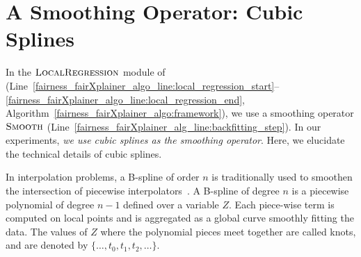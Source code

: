 \section{A Smoothing Operator: Cubic Splines}
\label{fairness_fairXplainer_sec:smoothing} 
In the $\textsc{LocalRegression}$ module of {\fairXplainer} (Line~\ref{fairness_fairXplainer_algo_line:local_regression_start}--\ref{fairness_fairXplainer_algo_line:local_regression_end}, Algorithm~\ref{fairness_fairXplainer_algo:framework}), we use a smoothing operator $\textsc{Smooth}$ (Line~\ref{fairness_fairXplainer_alg_line:backfitting_step}). In our experiments, \textit{we use cubic splines as the smoothing operator}. Here, we elucidate the technical details of cubic splines.

In interpolation problems, a B-spline of order $ n $ is traditionally used to smoothen the intersection of piecewise interpolators~\cite{schumaker2007spline}. A B-spline of degree $n$ is a piecewise polynomial of degree $ n - 1 $ defined over a variable $ Z $. Each piece-wise term is computed on local points and is aggregated as a global curve smoothly fitting the data. The values of $ Z $ where the polynomial pieces meet together are called knots, and are denoted by $\{ \dots, t_0, t_1, t_2, \dots\} $. 

